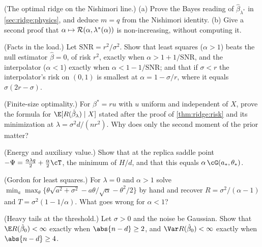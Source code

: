 \begin{refsection}
\begin{exercises}
\item \consolidation (The optimal ridge on the Nishimori line.) (a) Prove the Bayes reading of $\hat\beta_{\lambda^*}$ in \cref{sec:ridge:physics}, and deduce $m=q$ from the Nishimori identity. (b) Give a second proof that $\alpha\mapsto\mathcal{R}(\alpha,\lambda^*(\alpha))$ is non-increasing, without computing it. \label{ex:ridge:nishimori}

\item \consolidation (Facts in the load.) Let $\mathrm{SNR}=r^2/\sigma^2$. Show that least squares ($\alpha>1$) beats the null estimator $\hat\beta=0$, of risk $r^2$, exactly when $\alpha>1+1/\mathrm{SNR}$, and the interpolator ($\alpha<1$) exactly when $\alpha<1-1/\mathrm{SNR}$; and that if $\sigma<r$ the interpolator's risk on $(0,1)$ is smallest at $\alpha=1-\sigma/r$, where it equals $\sigma(2r-\sigma)$.\label{ex:ridge:facts}

\item \consolidation (Finite-size optimality.) For $\beta^*=ru$ with $u$ uniform and independent of $X$, prove the formula for $\E[R(\hat\beta_\lambda)\mid X]$ stated after the proof of \cref{thm:ridge:risk} and its minimization at $\lambda=\sigma^2d/(nr^2)$. Why does only the second moment of the prior matter?\label{ex:ridge:dicker}

\item \byhand (Energy and auxiliary value.) Show that at the replica saddle point $-\Psi=\frac{\alpha\lambda q}2+\frac\alpha2\cT$, the minimum of $H/d$, and that this equals $\alpha\,\cG(a_*,\theta_*)$. \label{ex:ridge:energy}

\item \byhand (Gordon for least squares.) For $\lambda=0$ and $\alpha>1$ solve $\min_a\max_\theta\{\theta\sqrt{a^2+\sigma^2}-a\theta/\sqrt\alpha-\theta^2/2\}$ by hand and recover $R=\sigma^2/(\alpha-1)$ and $T=\sigma^2(1-1/\alpha)$. What goes wrong for $\alpha<1$?\label{ex:ridge:ols}

\item \byhand\hard (Heavy tails at the threshold.) Let $\sigma>0$ and the noise be Gaussian. Show that $\E R(\hat\beta_0)<\infty$ exactly when $\abs{n-d}\ge2$, and $\Var R(\hat\beta_0)<\infty$ exactly when $\abs{n-d}\ge4$. \label{ex:ridge:tails}


\end{exercises}
\end{refsection}
